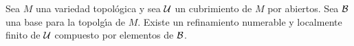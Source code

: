 \begin{teoRefinamiento}\label{thm:refinamiento}
	Sea $M$ una variedad topol\'{o}gica y sea $\cal U$ un cubrimiento de
	$M$ por abiertos. Sea $\cal B$ una base para la topolg\'{\i}a de $M$.
	Existe un refinamiento numerable y localmente finito de $\cal U$
	compuesto por elementos de $\cal B$.
\end{teoRefinamiento}

